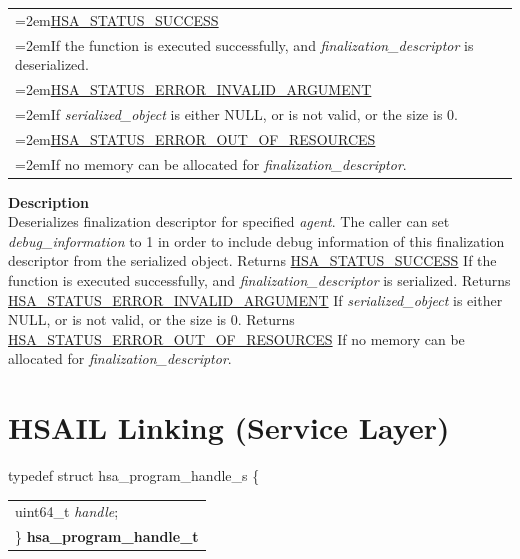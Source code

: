 \documentclass[final]{book}
\newcommand{\reffld}[1]{\textit{#1}}
\begin{document}
\begin{appendices}
\begin{longtable}{@{}>{\hangindent=2em}p{\linewidth}}
\hyperlink{group--status-1ggad755322e7ff95456520e8abdbe90d225ae382ea0c9c05cce5a60d0317375159cc}{HSA_STATUS_SUCCESS}\\\hspace{2em}If the function is executed successfully, and \textit{finalization_descriptor} is deserialized.\\[2mm]
\hyperlink{group--status-1ggad755322e7ff95456520e8abdbe90d225ac7d3651f75107d2a6a8ba3b25683c030}{HSA_STATUS_ERROR_INVALID_ARGUMENT}\\\hspace{2em}If \textit{serialized_object} is either NULL, or is not valid, or the size is 0.\\[2mm]
\hyperlink{group--status-1ggad755322e7ff95456520e8abdbe90d225a1a77fcf36d0d140874c4361ab093eff7}{HSA_STATUS_ERROR_OUT_OF_RESOURCES}\\\hspace{2em}If no memory can be allocated for \textit{finalization_descriptor}.
\end{longtable}
\vspace{-4mm}\noindent\textbf{Description}\\[1mm]
Deserializes finalization descriptor for specified \textit{agent}. The caller can set \textit{debug_information} to 1 in order to include debug information of this finalization descriptor from the serialized object. Returns \hyperlink{group--status-1ggad755322e7ff95456520e8abdbe90d225ae382ea0c9c05cce5a60d0317375159cc}{HSA_STATUS_SUCCESS} If the function is executed successfully, and \textit{finalization_descriptor} is serialized. Returns \hyperlink{group--status-1ggad755322e7ff95456520e8abdbe90d225ac7d3651f75107d2a6a8ba3b25683c030}{HSA_STATUS_ERROR_INVALID_ARGUMENT} If \textit{serialized_object} is either NULL, or is not valid, or the size is 0. Returns \hyperlink{group--status-1ggad755322e7ff95456520e8abdbe90d225a1a77fcf36d0d140874c4361ab093eff7}{HSA_STATUS_ERROR_OUT_OF_RESOURCES} If no memory can be allocated for \textit{finalization_descriptor}. 
 

\section{HSAIL Linking (Service Layer)}
\makeatletter{}

\noindent\begin{tcolorbox}[breakable,nobeforeafter,arc=0mm,colframe=white,colback=lightgray,left=0mm]
typedef struct  hsa_program_handle_s \{
\vspace{-3.5mm}\begin{longtable}{@{}p{\textwidth}}
\hspace{1.7em}uint64_t \reffld{handle};\\
\}  \hypertarget{group--HsailLinkerServiceLayer-1ga7b28ca39da981be49aac99608eb386cb}{\textbf{hsa_program_handle_t}}
\end{longtable}


\end{tcolorbox}
\end{appendices}
\end{document}
